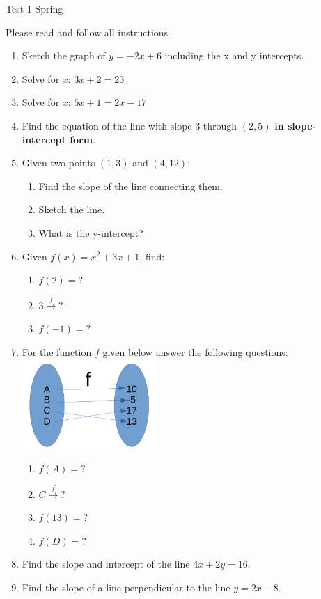 \documentclass{article}
\begin{document}
\begin{center}
	\Large Test 1 Spring
\end{center}
Please read and follow all instructions.
\begin{enumerate}
	\item Sketch the graph of $y=-2x + 6$ including the x and y intercepts.
	\item Solve for $x$:
	$3x + 2 = 23$
	\item Solve for $x$:
	$5x + 1 = 2x - 17$
	\item Find the equation of the line with slope 3 through $(2,5)$
	\textbf{in slope-intercept form}.
	\item Given two points $(1,3)$ and $(4, 12)$:
	\begin{enumerate}
		\item Find the slope of the line connecting them.
		\item Sketch the line.
		\item What is the y-intercept?
	\end{enumerate}
	\item Given $f(x)=x^2+3x+1$, find:
	\begin{enumerate}
		\item $f(2) = ?$
		\item $3 \stackrel{f}{\longmapsto} ?$
		\item $f(-1)=?$
	\end{enumerate}
	\item For the function $f$ given below answer the following questions:
	\newline 
	\includegraphics[width=2in]{sptest1_img1.png}
	\begin{enumerate}
		\item $f(A)=?$
		\item $C \stackrel{f}{\longmapsto} ?$
		\item $f(13)=?$
		\item $f(D)=?$
	\end{enumerate}
	\newpage
	\item Find the slope and intercept of the line $4x + 2y = 16$.
	\item Find the slope of a line perpendicular to the line $y=2x - 8$.

\end{enumerate}
\end{document}
